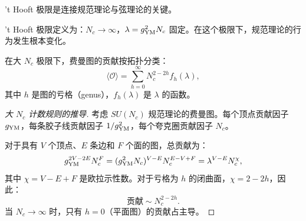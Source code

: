 't Hooft 极限是连接规范理论与弦理论的关键。

\begin{definition}['t Hooft 极限]
't Hooft 极限定义为：$N_c \to \infty$，$\lambda = g_{\rm YM}^2 N_c$ 固定。在这个极限下，规范理论的行为发生根本变化。
\end{definition}

\begin{theorem}[大 $N_c$ 计数规则]
在大 $N_c$ 极限下，费曼图的贡献按拓扑分类：
\begin{equation}
    \langle \mathcal{O} \rangle = \sum_{h=0}^{\infty} N_c^{2-2h} f_h(\lambda),
\end{equation}
其中 $h$ 是图的亏格（genus），$f_h(\lambda)$ 是 $\lambda$ 的函数。
\end{theorem}

\begin{proof}[大 $N_c$ 计数规则的推导]
考虑 $SU(N_c)$ 规范理论的费曼图。每个顶点贡献因子 $g_{\rm YM}$，每条胶子线贡献因子 $1/g_{\rm YM}^2$，每个夸克圈贡献因子 $N_c$。

对于具有 $V$ 个顶点、$E$ 条边和 $F$ 个面的图，总贡献为：
\begin{equation}
    g_{\rm YM}^{2V-2E} N_c^F = (g_{\rm YM}^2 N_c)^{V-E} N_c^{E-V+F} = \lambda^{V-E} N_c^{\chi},
\end{equation}
其中 $\chi = V - E + F$ 是欧拉示性数。对于亏格为 $h$ 的闭曲面，$\chi = 2 - 2h$，因此：
\begin{equation}
    \text{贡献} \sim N_c^{2-2h}.
\end{equation}
当 $N_c \to \infty$ 时，只有 $h=0$（平面图）的贡献占主导。
\end{proof}

